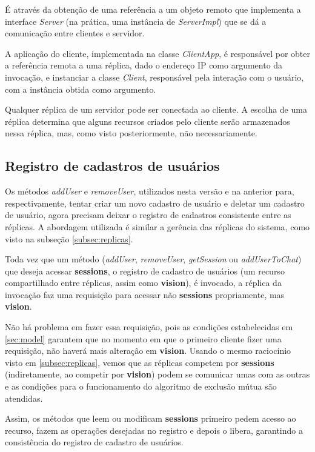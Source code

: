 \documentclass[../main.tex]{subfiles}
\begin{document}
É através da obtenção de uma referência a um objeto remoto que implementa a interface \textit{Server} (na prática, uma instância de \textit{ServerImpl}) que se dá a comunicação entre clientes e servidor.

A aplicação do cliente, implementada na classe \textit{ClientApp}, é responsável por obter a referência remota a uma réplica, dado o endereço IP como argumento da invocação, e instanciar a classe \textit{Client}, responsável pela interação com o usuário, com a instância obtida como argumento.

Qualquer réplica de um servidor pode ser conectada ao cliente.
A escolha de uma réplica determina que alguns recursos criados pelo cliente serão armazenados nessa réplica, mas, como visto posteriormente, não necessariamente.

\subsection{Registro de cadastros de usuários}

Os métodos \textit{addUser} e \textit{removeUser}, utilizados nesta versão e na anterior para, respectivamente, tentar criar um novo cadastro de usuário e deletar um cadastro de usuário, agora precisam deixar o registro de cadastros consistente entre as réplicas.
A abordagem utilizada é similar a gerência das réplicas do sistema, como visto na subseção \ref{subsec:replicas}.

Toda vez que um método (\textit{addUser}, \textit{removeUser}, \textit{getSession} ou \textit{addUserToChat}) que deseja acessar \textbf{sessions}, o registro de cadastro de usuários (um recurso compartilhado entre réplicas, assim como \textbf{vision}), é invocado, a réplica da invocação faz uma requisição para acessar não \textbf{sessions} propriamente, mas \textbf{vision}.

Não há problema em fazer essa requisição, pois as condições estabelecidas em \ref{sec:model} garantem que no momento em que o primeiro cliente fizer uma requisição, não haverá mais alteração em \textbf{vision}.
Usando o mesmo raciocínio visto em \ref{subsec:replicas}, vemos que as réplicas competem por \textbf{sessions} (indiretamente, ao competir por \textbf{vision}) podem se comunicar umas com as outras e as condições para o funcionamento do algoritmo de exclusão mútua são atendidas.

Assim, os métodos que leem ou modificam \textbf{sessions} primeiro pedem acesso ao recurso, fazem as operações desejadas no registro e depois o libera, garantindo a consistência do registro de cadastro de usuários.
\end{document}
